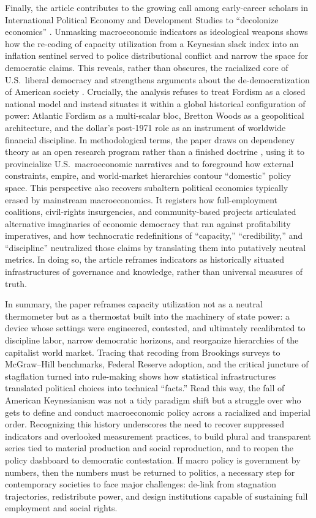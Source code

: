 \documentclass[11pt]{article}
\begin{document}
Finally, the article contributes to the growing call among early-career scholars in International Political Economy and Development Studies to ``decolonize economics'' \citep{kvangravenkesar2023,duttalveskesar2025}. Unmasking macroeconomic indicators as ideological weapons shows how the re-coding of capacity utilization from a Keynesian slack index into an inflation sentinel served to police distributional conflict and narrow the space for democratic claims. This reveals, rather than obscures, the racialized core of U.S.\ liberal democracy and strengthens arguments about the de-democratization of American society \citep{kiely2016}. Crucially, the analysis refuses to treat Fordism as a closed national model and instead situates it within a global historical configuration of power: Atlantic Fordism as a multi-scalar bloc, Bretton Woods as a geopolitical architecture, and the dollar's post-1971 role as an instrument of worldwide financial discipline. In methodological terms, the paper draws on dependency theory as an open research program rather than a finished doctrine \citep{kvangraven2021}, using it to provincialize U.S.\ macroeconomic narratives and to foreground how external constraints, empire, and world-market hierarchies contour ``domestic'' policy space. This perspective also recovers subaltern political economies typically erased by mainstream macroeconomics. It registers how full-employment coalitions, civil-rights insurgencies, and community-based projects articulated alternative imaginaries of economic democracy that ran against profitability imperatives, and how technocratic redefinitions of ``capacity,'' ``credibility,'' and ``discipline'' neutralized those claims by translating them into putatively neutral metrics. In doing so, the article reframes indicators as historically situated infrastructures of governance and knowledge, rather than universal measures of truth.

In summary, the paper reframes capacity utilization not as a neutral thermometer but as a thermostat built into the machinery of state power: a device whose settings were engineered, contested, and ultimately recalibrated to discipline labor, narrow democratic horizons, and reorganize hierarchies of the capitalist world market. Tracing that recoding from Brookings surveys to McGraw--Hill benchmarks, Federal Reserve adoption, and the critical juncture of stagflation turned into rule-making shows how statistical infrastructures translated political choices into technical ``facts.'' Read this way, the fall of American Keynesianism was not a tidy paradigm shift but a struggle over who gets to define and conduct macroeconomic policy across a racialized and imperial order. Recognizing this history underscores the need to recover suppressed indicators and overlooked measurement practices, to build plural and transparent series tied to material production and social reproduction, and to reopen the policy dashboard to democratic contestation. If macro policy is government by numbers, then the numbers must be returned to politics, a necessary step for contemporary societies to face major challenges: de-link from stagnation trajectories, redistribute power, and design institutions capable of sustaining full employment and social rights.

\pagebreak


\end{document}
